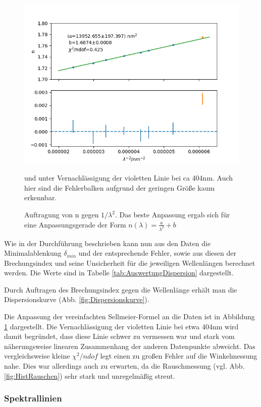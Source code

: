 \documentclass[12pt,a4paper]{article}
\begin{document}
\begin{figure}
\includegraphics[scale=1.0]{Bilder/Regression.png}
\caption{Auftragung von n gegen $1/\lambda^2$. Das beste Anpassung ergab sich für eine Anpassungsgerade der Form $n(\lambda) = \frac{a}{\lambda^2} + b $} und unter Vernachlässigung der violetten Linie bei ca 404nm. Auch hier sind die Fehlerbalken aufgrund der geringen Größe kaum erkennbar.
\label{fig:RegressionDispersion}
\end{figure}


Wie in der Durchführung beschrieben kann nun aus den Daten die Minimalablenkung $\delta_{min}$ und der entsprechende Fehler, sowie aus diesen der Brechungsindex und seine Unsicherheit für die jeweiligen Wellenlängen berechnet werden.
Die Werte sind in Tabelle \ref{tab:AuswertungDispersion} dargestellt.

Durch Auftragen des Brechungsindex gegen die Wellenlänge erhält man die Dispersionskurve (Abb. \ref{fig:Dispersionskurve}).

Die Anpassung der vereinfachten Sellmeier-Formel an die Daten ist in Abbildung \ref{fig:RegressionDispersion} dargestellt. Die Vernachlässigung der violetten Linie bei etwa 404nm wird damit begründet, dass diese Linie schwer zu vermessen war und stark vom näherungsweise linearen Zusammenhang der anderen Datenpunkte abweicht.
Das vergleichsweise kleine $\chi^2 / ndof$ legt einen zu großen Fehler auf die Winkelmessung nahe. Dies war allerdings auch zu erwarten, da die Rauschmessung (vgl. Abb. \ref{fig:HistRauschen}) sehr stark und unregelmäßig streut.
\subsubsection{Spektrallinien}
\end{document}
